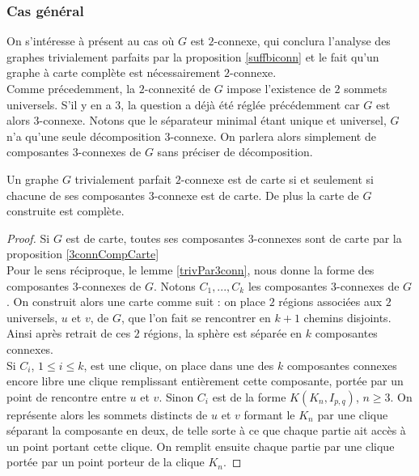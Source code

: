 \documentclass{scrartcl}
\begin{document}
\begin{flushleft}
\subsubsection{Cas général}

On s'intéresse à présent au cas où $G$ est $2$-connexe, qui conclura l'analyse des graphes trivialement parfaits par la proposition
\ref{suffbiconn} et le fait qu'un graphe à carte complète est nécessairement $2$-connexe.\\
Comme précedemment, la $2$-connexité de $G$ impose l'existence de $2$ sommets universels. S'il y en a $3$, la question
a déjà été réglée précédemment car $G$ est alors $3$-connexe. Notons que le séparateur minimal étant unique et universel,
$G$ n'a qu'une seule décomposition $3$-connexe. On parlera alors simplement de composantes $3$-connexes de $G$ sans préciser
de décomposition.

\begin{theorem}\label{maptrivperf}
    Un graphe $G$ trivialement parfait $2$-connexe est de carte si et seulement si chacune de ses composantes $3$-connexe est de carte.
    De plus la carte de $G$ construite est complète.
\end{theorem}

\begin{proof}
    Si $G$ est de carte, toutes ses composantes $3$-connexes sont de carte par la proposition \ref{3connCompCarte}\\
    Pour le sens réciproque, le lemme \ref{trivPar3conn}, nous donne la forme des composantes $3$-connexes de $G$.
    Notons $C_1, ..., C_k$ les composantes $3$-connexes de $G$. On construit alors une carte comme suit :
    on place $2$ régions associées aux $2$ universels, $u$ et $v$, de $G$, que l'on fait se rencontrer en $k+1$ chemins disjoints.
    Ainsi après retrait de ces $2$ régions, la sphère est séparée en $k$ composantes connexes.\\
    Si $C_i$, $1 \leq i \leq k$, est une clique, on place dans une des $k$ composantes connexes encore libre une clique
    remplissant entièrement cette composante, portée par un point de rencontre entre $u$ et $v$. Sinon $C_i$ est
    de la forme $K(K_n, I_{p,q})$, $n \geq 3$. On représente alors les sommets distincts de $u$ et $v$ formant le $K_n$
    par une clique séparant la composante en deux, de telle sorte à ce que chaque partie ait accès à un point portant
    cette clique. On remplit ensuite chaque partie par une clique portée par un point porteur de la clique $K_n$.
\end{proof}


\end{flushleft}
\end{document}
